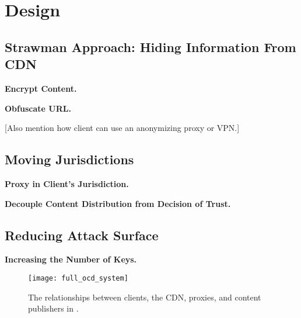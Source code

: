 \section{Design}
\label{sec:design}

\subsection{Strawman Approach: Hiding Information From CDN}

{\bf Encrypt Content.}

{\bf Obfuscate URL.}

[Also mention how client can use an anonymizing proxy or VPN.]

\subsection{Moving Jurisdictions}

{\bf Proxy in Client's Jurisdiction.}

{\bf Decouple Content Distribution from Decision of Trust.}

\subsection{Reducing Attack Surface}

{\bf Increasing the Number of Keys.}

\begin{figure}[h]
\centering
\texttt{[image: full\_ocd\_system]}
\caption{The relationships between clients, the CDN, proxies, and content publishers in 
\system{}.}
\label{fig:ocd_overview}
\end{figure}
